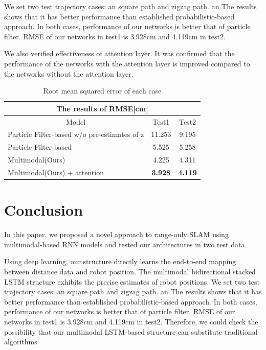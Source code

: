 \documentclass{ieeeaccess}
\begin{document}
We set two test trajectory cases: an square path and zigzag path. an The results shows that it has better performance than established probabilistic-based approach. In both cases, performance of our networks  is better that of particle filter. RMSE of our networks in test1 is 3.928cm and 4.119cm in test2.

We also verified effectiveness of attention layer. It was confirmed that the performance of the networks with the attention layer is improved compared to the networks without the attention layer.

\begin{table}[h]
	\begin{tabular}{lllcc}
		\hline
		\multicolumn{5}{c}{The results of RMSE{[}cm{]}}                                                                          \\ \hline
		\multicolumn{3}{c|}{Model}                                        & \multicolumn{1}{c|}{Test1}          & Test2          \\ \hline
		\multicolumn{3}{l|}{Particle Filter-based w/o pre-estimates of z} & \multicolumn{1}{c|}{11.253}         & 9.195          \\
		\multicolumn{3}{l|}{Particle Filter-based}                        & \multicolumn{1}{c|}{5.525}          & 5.258          \\
		\multicolumn{3}{l|}{Multimodal(Ours)}                                   & \multicolumn{1}{c|}{4.225}          & 4.311          \\
		\multicolumn{3}{l|}{Multimodal(Ours) + attention}                       & \multicolumn{1}{c|}{\textbf{3.928}} & \textbf{4.119}
	\end{tabular}
	\caption{Root mean squared error of each case}
	\label{table:RMSE_table}
\end{table}



\section{Conclusion}

In this paper, we proposed a novel approach to range-only SLAM using multimodal-based RNN models and tested our architectures in two test data.

Using deep learning, our structure directly learns the end-to-end mapping between distance data and robot position. The multimodal bidirectional stacked LSTM structure exhibits the precise estimates of robot positions. We set two test trajectory cases: an square path and zigzag path. an The results shows that it has better performance than established probabilistic-based approach. In both cases, performance of our networks  is better that of particle filter. RMSE of our networks in test1 is 3.928cm and 4.119cm in test2. Therefore, we could check the possibility that our multimodal LSTM-based structure can substitute traditional algorithms
\end{document}
